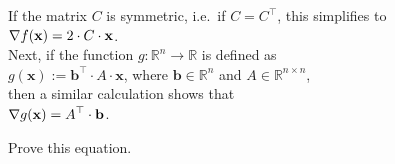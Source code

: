 If the matrix $C$ is symmetric, i.e.~if $C = C^\top$, this simplifies to
\\[0.2cm]
\hspace*{1.3cm}
$\displaystyle \nabla f(\mathbf{x}) = 2 \cdot C \cdot \mathbf{x}$.
\\[0.2cm]
Next, if the function $g: \mathbb{R}^n \rightarrow \mathbb{R}$ is defined as 
\\[0.2cm]
\hspace*{1.3cm}
$g(\mathbf{x}) := \mathbf{b}^\top \cdot A \cdot \mathbf{x}$, \quad where $\mathbf{b} \in \mathbb{R}^n$ and $A \in \mathbb{R}^{n \times n}$,
\\[0.2cm]
then a similar calculation shows that
\\[0.2cm]
\hspace*{1.3cm}
$\displaystyle \nabla g(\mathbf{x}) = A^\top \cdot \mathbf{b}$.

\exercise
Prove this equation.

